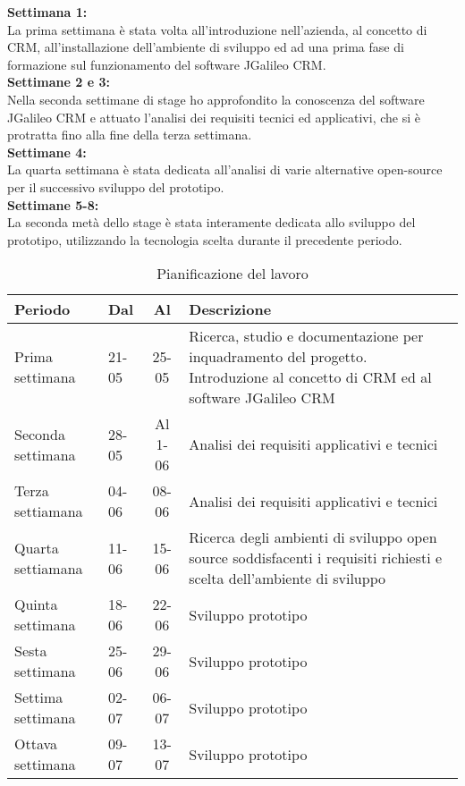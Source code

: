 \textbf{Settimana 1:}\\
La prima settimana è stata volta all'introduzione nell'azienda, al concetto di CRM, all'installazione dell'ambiente di sviluppo ed ad una prima fase di formazione sul funzionamento del software JGalileo CRM.\\
\textbf{Settimane 2 e 3:}\\
Nella seconda settimane di stage ho approfondito la conoscenza del software JGalileo CRM e attuato l'analisi dei requisiti tecnici ed applicativi, che si è protratta fino alla fine della terza settimana.\\
\textbf{Settimane 4:}\\
La quarta settimana è stata dedicata all'analisi di varie alternative open-source per il successivo sviluppo del prototipo. \\
\textbf{Settimane 5-8:}\\
La seconda metà dello stage è stata interamente dedicata allo sviluppo del prototipo, utilizzando la tecnologia scelta durante il precedente periodo.\\

\begin{table}[h]
\centering
\caption{Pianificazione del lavoro}
\label{tab:pianificazione-del-lavoro}
\begin{tabular}{|l|l|c|p{7cm}|}
\hline
Periodo  & Dal & Al &Descrizione\\
\hline
Prima settimana  & 21-05 & 25-05 & Ricerca, studio e documentazione per inquadramento del
progetto.
Introduzione al concetto di CRM ed al software JGalileo CRM\\
\hline
Seconda settimana  & 28-05 & Al 1-06 & Analisi dei requisiti applicativi e tecnici\\
\hline
Terza settiamana & 04-06 & 08-06 &Analisi dei requisiti applicativi e tecnici\\
\hline
Quarta settiamana  & 11-06 & 15-06 & Ricerca degli ambienti di sviluppo open source soddisfacenti i requisiti richiesti e scelta dell’ambiente di sviluppo\\
\hline
Quinta settimana  & 18-06 & 22-06 & Sviluppo prototipo\\
\hline
Sesta settimana  & 25-06 & 29-06 & Sviluppo prototipo\\
\hline
Settima settimana  & 02-07 & 06-07 &Sviluppo prototipo\\
\hline
Ottava settimana  & 09-07 & 13-07 &Sviluppo prototipo\\
\hline
\end{tabular}
\end{table}


